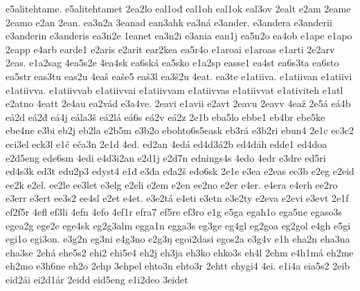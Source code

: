 {    e5alitehtame.
    e5alitehtamet
    2ea2lo
    eal1ođ
    eal1oh
    eal1ok
    eal3ov
    2ealt
    e2am
    2eame
    2eamo
    e2an
    2ean.
    ea3n2a
    3eanad
    ean3ahk
    ea3ná
    e3ander.
    e3andera
    e3anderii
    e3anderin
    e3anderis
    ea3n2e
    1eanet
    ea3n2i
    e3ania
    ean1j
    ea5n2o
    ea4ob
    e1ape
    e1apo
    2eapp
    e4arb
    earde1
    e2aris
    e2arit
    ear2kea
    ea5r4o
    e1aroai
    e1aroas
    e1arti
    2e2arv
    2eas.
    e1a2sag
    4ea5s2e
    4ea4sk
    ea6ská
    ea5sko
    e1a2sp
    easse1
    ea4st
    ea6s3ta
    ea6sto
    ea5str
    eas3tu
    eas2u
    4eaš
    eaše5
    eaš3l
    ea3š2u
    4eat.
    ea3te
    e1atiiva.
    e1atiivan
    e1atiivi
    e1atiivva.
    e1atiivvab
    e1atiivvai
    e1atiivvam
    e1atiivvas
    e1atiivvat
    e1ativiteh
    e1atl
    e2atno
    4eatt
    2e4au
    ea2vád
    e3a4ve.
    2eavi
    e1avii
    e2avt
    2eavu
    2eavv
    4eaž
    2e5á
    eá4b
    eá2d
    eá2đ
    eá4j
    eála3š
    eá2lá
    eá6s
    eá2v
    eá2z
    2e1b
    eba5lo
    ebbe1
    eb4br
    ebe5ke
    ebe4ne
    e3bi
    eb2j
    eb2la
    e2b5m
    e3b2o
    ebohto6s5eask
    eb3rá
    e3b2ri
    ebun4
    2e1c
    ec3c2
    eci3el
    eck3l
    e1č
    eča3n
    2e1d
    4ed.
    ed2an
    4edá
    ed4d3á2b
    ed4dáh
    edde1
    ed4doa
    e2d5eng
    ede6sm
    4edi
    e4d3i2an
    e2d1j
    e2d7n
    ednings4s
    4edo
    4edr
    e3dre
    ed5ri
    ed4s3k
    ed3t
    edu2p3
    edyst4
    e1đ
    e3đa
    eđa2š
    eđo6sk
    2e1e
    e3ea
    e2eas
    ee3b
    e2eg
    e2eid
    ee2k
    e2el.
    ee2le
    ee3let
    e3elg
    e2eli
    e2em
    e2en
    ee2no
    e2er
    e4er.
    e4era
    e4erh
    ee2ro
    e3err
    e3ert
    ee3s2
    ee4sl
    e2et
    e4et.
    e3e2tá
    e4eti
    e3etn
    e3e2ty
    e2eva
    e2evi
    e3evt
    2e1f
    ef2f5r
    4efl
    ef3li
    4efn
    4efo
    4ef1r
    efra7
    ef5re
    ef3ro
    e1g
    e5ga
    egah1o
    ega5ne
    egaso3s
    egea2g
    ege2e
    ege4sk
    eg2g3alm
    egga1n
    egga3s
    eg3ge
    eg4gl
    eg2goa
    eg2gol
    e4gh
    e5gi
    egi1o
    egi3on.
    e3g2n
    eg3ni
    e4g3no
    e2g3ŋ
    egoi2dasi
    egos2a
    e3g4v
    e1h
    eha2n
    eha3na
    eha3se
    2ehá
    ehe5s2
    ehi2
    ehi5e4
    eh2j
    eh3ja
    eh3ko
    ehko3s
    eh4l
    2ehm
    e4h1má
    eh2me
    eh2mo
    e3h6ne
    eh2o
    2ehp
    3ehpel
    ehto3n
    ehto3r
    2ehtt
    ehygi4
    4ei.
    e1i4a
    eia5s2
    2eib
    eid2ái
    ei2d1ár
    2eidd
    eid5eng
    e1i2deo
    3eidet
}
